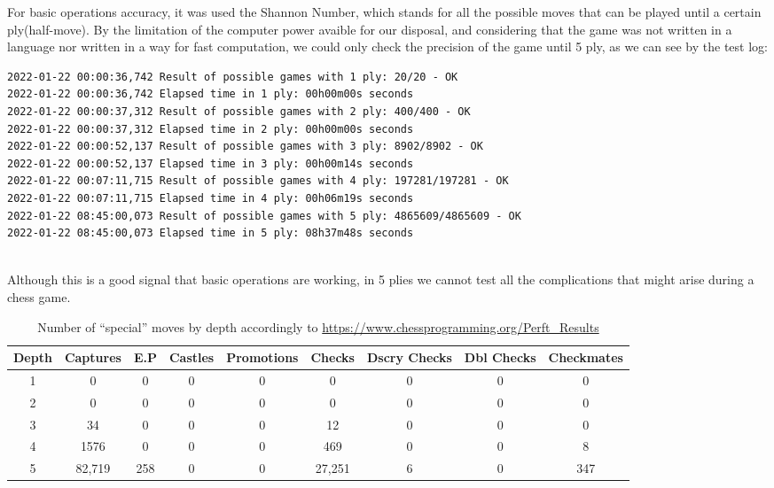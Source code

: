 \documentclass[10pt]{article}
\begin{document}
For basic operations accuracy, it was used the Shannon Number,
which stands for all the possible moves that can be played until a certain
ply(half-move). By the limitation of the computer power avaible for our
disposal, and considering that the game was not written in a language nor
written in a way for fast computation, we could only check the precision of the
game until 5 ply, as we can see by the test log:
\begin{lstlisting}
2022-01-22 00:00:36,742 Result of possible games with 1 ply: 20/20 - OK
2022-01-22 00:00:36,742 Elapsed time in 1 ply: 00h00m00s seconds
2022-01-22 00:00:37,312 Result of possible games with 2 ply: 400/400 - OK
2022-01-22 00:00:37,312 Elapsed time in 2 ply: 00h00m00s seconds
2022-01-22 00:00:52,137 Result of possible games with 3 ply: 8902/8902 - OK
2022-01-22 00:00:52,137 Elapsed time in 3 ply: 00h00m14s seconds
2022-01-22 00:07:11,715 Result of possible games with 4 ply: 197281/197281 - OK
2022-01-22 00:07:11,715 Elapsed time in 4 ply: 00h06m19s seconds
2022-01-22 08:45:00,073 Result of possible games with 5 ply: 4865609/4865609 - OK
2022-01-22 08:45:00,073 Elapsed time in 5 ply: 08h37m48s seconds
    
\end{lstlisting}

Although this is a good signal that basic operations are working, in 5 plies we
cannot test all the complications that might arise during a chess game.

\begin{table}[h]
\center
\begin{tabular}{|c|c|c|c|c|c|c|c|c|}
\hline
\textbf{Depth}   & \textbf{Captures} & \textbf{E.P} &
\textbf{Castles} & \textbf{Promotions} & \textbf{Checks} & \textbf{Dscry
Checks} & \textbf{Dbl Checks} & \textbf{Checkmates} \\
\hline
   1  & 0 & 0 & 0 & 0 & 0 & 0 & 0 & 0 \\
\hline
   2  & 0 & 0 & 0 & 0 & 0 & 0 & 0 & 0 \\
\hline
   3  & 34 & 0 & 0 & 0 & 12 & 0 & 0 & 0 \\
\hline
   4  & 1576 & 0 & 0 & 0 & 469 & 0 & 0 & 8 \\
\hline
5  & 82,719 & 258 & 0 & 0 & 27,251 & 6 & 0 & 347 \\
\hline
\end{tabular}
\caption{Number of ``special'' moves by depth accordingly to
\url{https://www.chessprogramming.org/Perft_Results} }
\end{table}
\end{document}
